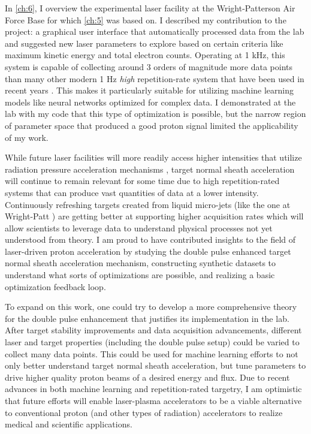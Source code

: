 In \autoref{ch:6}, I overview the experimental laser facility at the Wright-Patterson Air Force Base for which \autoref{ch:5} was based on. I described my contribution to the project: a graphical user interface that automatically processed data from the lab and suggested new laser parameters to explore based on certain criteria like maximum kinetic energy and total electron counts. Operating at 1 kHz, this system is capable of collecting around 3 orders of magnitude more data points than many other modern 1 Hz \emph{high} repetition-rate system that have been used in recent years \cite{Streeter_2025_Nat,Treffert_2022_APL}. This makes it particularly suitable for utilizing machine learning models like neural networks optimized for complex data. I demonstrated at the lab with my code that this type of optimization is possible, but the narrow region of parameter space that produced a good proton signal limited the applicability of my work. 

While future laser facilities will more readily access higher intensities that utilize radiation pressure acceleration mechanisms \cite{Macchi_2013_RevModPhys}, target normal sheath acceleration will continue to remain relevant for some time due to high repetition-rated systems that can produce vast quantities of data at a lower intensity. Continuously refreshing targets created from liquid micro-jets (like the one at Wright-Patt \cite{George_2019_HPLSE}) are getting better at supporting higher acquisition rates \cite{Treffert_2022_APL, Streeter_2025_Nat} which will allow scientists to leverage data to understand physical processes not yet understood from theory. I am proud to have contributed insights to the field of laser-driven proton acceleration by studying the double pulse enhanced target normal sheath acceleration mechanism, constructing synthetic datasets to understand what sorts of optimizations are possible, and realizing a basic optimization feedback loop. 

To expand on this work, one could try to develop a more comprehensive theory for the double pulse enhancement that justifies its implementation in the lab. After target stability improvements and data acquisition advancements, different laser and target properties (including the double pulse setup) could be varied to collect many data points. This could be used for machine learning efforts to not only better understand target normal sheath acceleration, but tune parameters to drive higher quality proton beams of a desired energy and flux. Due to recent advances in both machine learning and repetition-rated targetry, I am optimistic that future efforts will enable laser-plasma accelerators to be a viable alternative to conventional proton (and other types of radiation) accelerators to realize medical and scientific applications. 